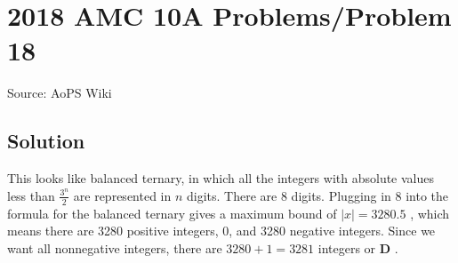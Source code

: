 \documentclass[12pt]{article}
\begin{document}
\section*{{2018 AMC 10A Problems/Problem 18}}
Source: AoPS Wiki

\subsection*{Solution}
This looks like balanced ternary, in which all the integers with absolute values less than $\frac{3^n}{2}$ are represented in $n$ digits. There are 8 digits. Plugging in 8 into the formula for the balanced ternary gives a maximum bound of $|x|=3280.5$ , which means there are 3280 positive integers, 0, and 3280 negative integers. Since we want all nonnegative integers, there are $3280+1=\boxed{3281}$ integers or $\boxed{\textbf{D}}$ .
\end{document}
